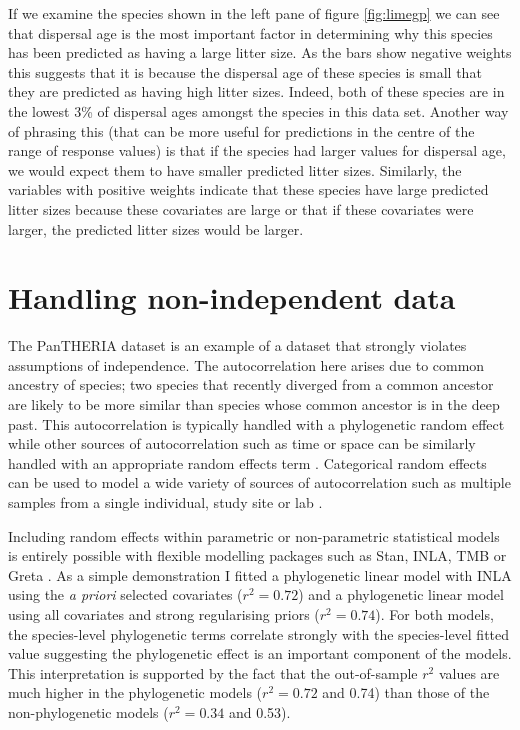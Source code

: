 \documentclass[12pt,]{article}
\begin{document}
If we examine the species shown in the left pane of figure \ref{fig:limegp} we can see that dispersal age is the most important factor in determining why this species has been predicted as having a large litter size.
As the bars show negative weights this suggests that it is because the dispersal age of these species is small that they are predicted as having high litter sizes.
Indeed, both of these species are in the lowest 3\% of dispersal ages amongst the species in this data set.
Another way of phrasing this (that can be more useful for predictions in the centre of the range of response values) is that if the species had larger values for dispersal age, we would expect them to have smaller predicted litter sizes.
Similarly, the variables with positive weights indicate that these species have large predicted litter sizes because these covariates are large or that if these covariates were larger, the predicted litter sizes would be larger.



\section{Handling non-independent data}\label{handling-non-independent-data}

The PanTHERIA dataset is an example of a dataset that strongly violates assumptions of independence.
The autocorrelation here arises due to common ancestry of species; two species that recently diverged from a common ancestor are likely to be more similar than species whose common ancestor is in the deep past.
This autocorrelation is typically handled with a phylogenetic random effect \citep{felsenstein1985phylogenies, ives2006statistics, gay2014parasite, pellissier2012shifts, ferguson2014colony} while other sources of autocorrelation such as time or space can be similarly handled with an appropriate random effects term \citep{ives2006statistics, redding2017evaluating, diggle1998model}.
Categorical random effects can be used to model a wide variety of sources of autocorrelation such as multiple samples from a single individual, study site or lab  \citep{harrison2018brief, bolker2009generalized}.

Including random effects within parametric or non-parametric statistical models is entirely possible with flexible modelling packages such as Stan, INLA, TMB or Greta  \citep{stan, INLA, golding2019greta, tmb}.
As a simple demonstration I fitted a phylogenetic linear model with INLA \citep{INLA} using the \emph{a priori} selected covariates (\(r^2 = 0.72\)) and a phylogenetic linear model using all covariates and strong regularising priors (\(r^2 = 0.74\)).
For both models, the species-level phylogenetic terms correlate strongly with the species-level fitted value suggesting the phylogenetic effect is an important component of the models.
This interpretation is supported by the fact that the out-of-sample $r^2$ values are much higher in the phylogenetic models ($r^2 = 0.72$ and 0.74) than those of the non-phylogenetic models ($r^2 = 0.34$ and 0.53). 
\end{document}
